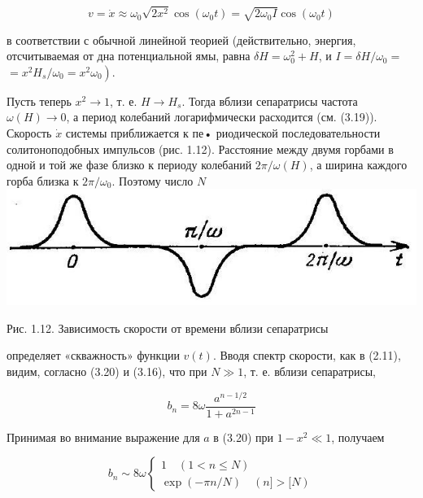 \documentclass[10pt]{article}
\begin{document}
$$
v=\dot{x} \approx \omega_{0} \sqrt{2 x^{2}} \cos \left(\omega_{0} t\right)=\sqrt{2 \omega_{0} I} \cos \left(\omega_{0} t\right)
$$

в соответствии с обычной линейной теорией (действительно, энергия, отсчитываемая от дна потенциальной ямы, равна $\delta H=\omega_{0}^{2}+H$, и $I=\delta H / \omega_{0}=$ $\left.=x^{2} H_{s} / \omega_{0}=x^{2} \omega_{0}\right)$.

Пусть теперь $x^{2} \rightarrow 1$, т. е. $H \rightarrow H_{s}$. Тогда вблизи сепаратрисы частота $\omega(H) \longrightarrow 0$, а период колебаний логарифмически расходится (см. (3.19)). Скорость $\dot{x}$ системы приближается к пе• риодической последовательности солитоноподобных импульсов (рис. 1.12). Расстояние между двумя горбами в одной и той же фазе близко к периоду колебаний $2 \pi / \omega(H)$, а ширина каждого горба близка к $2 \pi / \omega_{0}$. Поэтому число $N$\\
\includegraphics[max width=\textwidth, center]{2024_12_13_2abbd56e24043f80c30dg-4}

Рис. 1.12. Зависимость скорости от времени вблизи сепаратрисы

определяет «скважность» функции $v(t)$. Вводя спектр скорости, как в (2.11), видим, согласно (3.20) и (3.16), что при $N \gg 1$, т. е. вблизи сепаратрисы,

$$
b_{n}=8 \omega \frac{a^{n-1 / 2}}{1+a^{2 n-1}}
$$

Принимая во внимание выражение для $a$ в (3.20) при $1-x^{2} \ll 1$, получаем

\[
b_{n} \sim 8 \omega\left\{\begin{array}{l}
1 \quad(1<n \leqslant N)  \tag{3.21}\\
\exp (-\pi n / N) \quad(n]>[N)
\end{array}\right.
\]
\end{document}
